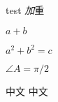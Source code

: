 \documentclass[12pt]{ctexart}
\begin{document}

test
\emph 加重

$a+b$

$a^2+b^2=c$

$\angle A=\pi/2$

中文
中文
\end{document}
